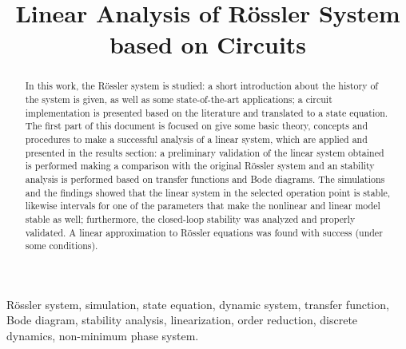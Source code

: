 \documentclass[conference]{IEEEtran}
\begin{document}
\title{Linear Analysis of Rössler System based on Circuits\\}

\author{
\and
{}
}

\maketitle

\begin{abstract}
In this work, the Rössler system is studied: a short introduction about the history of the system is given, as well as some state-of-the-art applications; a circuit implementation is presented based on the literature and translated to a state equation. The first part of this document is focused on give some basic theory, concepts and procedures to make a successful analysis of a linear system, which are applied and presented in the results section: a preliminary validation of the linear system obtained is performed making a comparison with the original Rössler system and an stability analysis is performed based on transfer functions and Bode diagrams. The simulations and the findings showed that the linear system in the selected operation point is stable, likewise intervals for one of the parameters that make the nonlinear and linear model stable as well; furthermore, the closed-loop stability was analyzed and properly validated. A linear approximation to Rössler equations was found with success (under some conditions).
\end{abstract}

\begin{IEEEkeywords}
Rössler system, simulation, state equation, dynamic system, transfer function, Bode diagram, stability analysis, linearization, order reduction, discrete dynamics, non-minimum phase system.
\end{IEEEkeywords}






\nocite{*}


\end{document}
